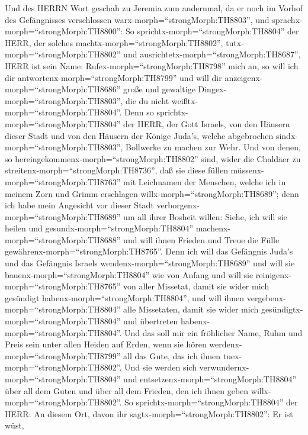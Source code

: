  Und des HERRN Wort geschah zu Jeremia zum andernmal, da er
noch im Vorhof des Gefängnisses verschlossen
warx-morph=``strongMorph:TH8803'', und
sprachx-morph=``strongMorph:TH8800'':  So
sprichtx-morph=``strongMorph:TH8804'' der HERR, der solches
machtx-morph=``strongMorph:TH8802'', tutx-morph=``strongMorph:TH8802''
und ausrichtetx-morph=``strongMorph:TH8687'', HERR ist sein Name:
 Rufex-morph=``strongMorph:TH8798'' mich an, so will ich dir
antwortenx-morph=``strongMorph:TH8799'' und will dir
anzeigenx-morph=``strongMorph:TH8686'' große und gewaltige
Dingex-morph=``strongMorph:TH8803'', die du nicht
weißtx-morph=``strongMorph:TH8804''.  Denn so
sprichtx-morph=``strongMorph:TH8804'' der HERR, der Gott Israels, von
den Häusern dieser Stadt und von den Häusern der Könige Juda's, welche
abgebrochen sindx-morph=``strongMorph:TH8803'', Bollwerke zu machen zur
Wehr.  Und von denen, so
hereingekommenx-morph=``strongMorph:TH8802'' sind, wider die Chaldäer zu
streitenx-morph=``strongMorph:TH8736'', daß sie diese füllen
müssenx-morph=``strongMorph:TH8763'' mit Leichnamen der Menschen, welche
ich in meinem Zorn und Grimm erschlagen
willx-morph=``strongMorph:TH8689''; denn ich habe mein Angesicht vor
dieser Stadt verborgenx-morph=``strongMorph:TH8689'' um all ihrer
Bosheit willen:  Siehe, ich will sie heilen und
gesundx-morph=``strongMorph:TH8804''
machenx-morph=``strongMorph:TH8688'' und will ihnen Frieden und Treue
die Fülle gewährenx-morph=``strongMorph:TH8765''.  Denn ich
will das Gefängnis Juda's und das Gefängnis Israels
wendenx-morph=``strongMorph:TH8689'' und will sie
bauenx-morph=``strongMorph:TH8804'' wie von Anfang  und will
sie reinigenx-morph=``strongMorph:TH8765'' von aller Missetat, damit sie
wider mich gesündigt habenx-morph=``strongMorph:TH8804'', und will ihnen
vergebenx-morph=``strongMorph:TH8804'' alle Missetaten, damit sie wider
mich gesündigtx-morph=``strongMorph:TH8804'' und übertreten
habenx-morph=``strongMorph:TH8804''.  Und das soll mir ein
fröhlicher Name, Ruhm und Preis sein unter allen Heiden auf Erden, wenn
sie hören werdenx-morph=``strongMorph:TH8799'' all das Gute, das ich
ihnen tuex-morph=``strongMorph:TH8802''. Und sie werden sich
verwundernx-morph=``strongMorph:TH8804'' und
entsetzenx-morph=``strongMorph:TH8804'' über all dem Guten und über all
dem Frieden, den ich ihnen geben willx-morph=``strongMorph:TH8802''.
 So sprichtx-morph=``strongMorph:TH8804'' der HERR: An
diesem Ort, davon ihr sagtx-morph=``strongMorph:TH8802'': Er ist wüst,
